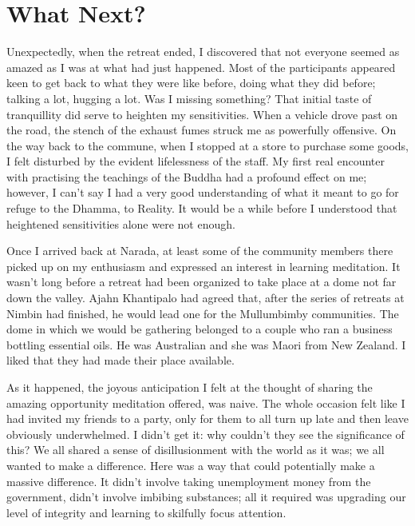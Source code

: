 \chapter{What Next?}

Unexpectedly, when the retreat ended, I discovered that not everyone
seemed as amazed as I was at what had just happened. Most of the participants
appeared keen to get back to what they were like before, doing what they
did before; talking a lot, hugging a lot. Was I missing something? That
initial taste of tranquillity did serve to heighten my sensitivities.
When a vehicle drove past on the road, the stench of the exhaust fumes
struck me as powerfully offensive. On the way back to the commune,
when I stopped at a store to purchase some goods, I felt disturbed by
the evident lifelessness of the staff. My first real encounter with
practising the teachings of the Buddha had a profound effect on me;
however, I can't say I had a very good understanding of what it meant to
go for refuge to the Dhamma, to Reality. It would be a while before I
understood that heightened sensitivities alone were not enough.

Once I arrived back at Narada, at least some of the community members
there picked up on my enthusiasm and expressed an interest in learning
meditation. It wasn't long before a retreat had been organized to take
place at a dome not far down the valley. Ajahn Khantipalo had agreed
that, after the series of retreats at Nimbin had finished, he would lead
one for the Mullumbimby communities. The dome in which we would be
gathering belonged to a couple who ran a business bottling essential
oils. He was Australian and she was Maori from New Zealand. I liked that
they had made their place available.

As it happened, the joyous anticipation I felt at the thought of sharing
the amazing opportunity meditation offered, was naive. The whole
occasion felt like I had invited my friends to a party, only for them to
all turn up late and then leave obviously underwhelmed. I didn't get it:
why couldn't they see the significance of this? We all shared a sense of
disillusionment with the world as it was; we all wanted to make a
difference. Here was a way that could potentially make a massive
difference. It didn't involve taking unemployment money from the
government, didn't involve imbibing substances; all it required was
upgrading our level of integrity and learning to skilfully focus
attention.

